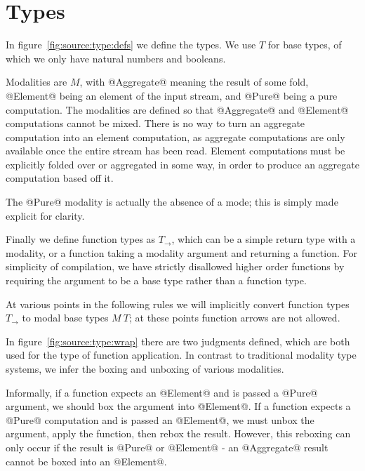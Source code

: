 \section{Types}
\label{s:Types}



In figure~\ref{fig:source:type:defs} we define the types.
We use $T$ for base types, of which we only have natural numbers and booleans.

Modalities are $M$, with @Aggregate@ meaning the result of some fold, @Element@ being an element of the input stream, and @Pure@ being a pure computation.
The modalities are defined so that @Aggregate@ and @Element@ computations cannot be mixed.
There is no way to turn an aggregate computation into an element computation, as aggregate computations are only available once the entire stream has been read.
Element computations must be explicitly folded over or aggregated in some way, in order to produce an aggregate computation based off it.

The @Pure@ modality is actually the absence of a mode; this is simply made explicit for clarity.

Finally we define function types as $T_\to$, which can be a simple return type with a modality, or a function taking a modality argument and returning a function.
For simplicity of compilation, we have strictly disallowed higher order functions by requiring the argument to be a base type rather than a function type.

At various points in the following rules we will implicitly convert function types $T_\to$ to modal base types $M~T$; at these points function arrows are not allowed.



In figure~\ref{fig:source:type:wrap} there are two judgments defined, which are both used for the type of function application.
In contrast to traditional modality type systems, we infer the boxing and unboxing of various modalities.

Informally, if a function expects an @Element@ and is passed a @Pure@ argument, we should box the argument into @Element@.
If a function expects a @Pure@ computation and is passed an @Element@, we must unbox the argument, apply the function, then rebox the result.
However, this reboxing can only occur if the result is @Pure@ or @Element@ - an @Aggregate@ result cannot be boxed into an @Element@.

